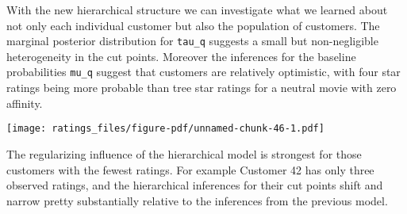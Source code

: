 \documentclass[
  letterpaper,
  DIV=11,
  numbers=noendperiod]{scrartcl}
\newenvironment{Shaded}{\begin{snugshade}}{\end{snugshade}}
\newcommand{\AttributeTok}[1]{\textcolor[rgb]{0.40,0.45,0.13}{#1}}
\newcommand{\ControlFlowTok}[1]{\textcolor[rgb]{0.00,0.23,0.31}{#1}}
\newcommand{\DecValTok}[1]{\textcolor[rgb]{0.68,0.00,0.00}{#1}}
\newcommand{\FloatTok}[1]{\textcolor[rgb]{0.68,0.00,0.00}{#1}}
\newcommand{\FunctionTok}[1]{\textcolor[rgb]{0.28,0.35,0.67}{#1}}
\newcommand{\NormalTok}[1]{\textcolor[rgb]{0.00,0.23,0.31}{#1}}
\newcommand{\OtherTok}[1]{\textcolor[rgb]{0.00,0.23,0.31}{#1}}
\newcommand{\SpecialCharTok}[1]{\textcolor[rgb]{0.37,0.37,0.37}{#1}}
\newcommand{\StringTok}[1]{\textcolor[rgb]{0.13,0.47,0.30}{#1}}
\begin{document}
With the new hierarchical structure we can investigate what we learned
about not only each individual customer but also the population of
customers. The marginal posterior distribution for \texttt{tau\_q}
suggests a small but non-negligible heterogeneity in the cut points.
Moreover the inferences for the baseline probabilities \texttt{mu\_q}
suggest that customers are relatively optimistic, with four star ratings
being more probable than tree star ratings for a neutral movie with zero
affinity.

\begin{Shaded}
\end{Shaded}

\texttt{[image: ratings\_files/figure-pdf/unnamed-chunk-46-1.pdf]}

The regularizing influence of the hierarchical model is strongest for
those customers with the fewest ratings. For example Customer 42 has
only three observed ratings, and the hierarchical inferences for their
cut points shift and narrow pretty substantially relative to the
inferences from the previous model.
\end{document}
